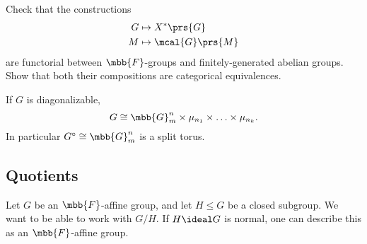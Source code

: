 \documentclass[10pt,a4paper,twoside,openany,hidelinks]{book}
\begin{document}
\begin{exercise}
Check that the constructions
\begin{align*}
G &\mapsto X^*\prs{G} \\
M &\mapsto \mcal{G}\prs{M}
\end{align*}
are functorial between $\mbb{F}$-groups and finitely-generated abelian groups.
Show that both their compositions are categorical equivalences.
\end{exercise}

\begin{corollary}
If $G$ is diagonalizable,
\[G \cong \mbb{G}_m^n \times \mu_{n_1} \times \ldots \times \mu_{n_k} \text{.}\]
In particular $G^{\circ} \cong \mbb{G}_m^n$ is a split torus.
\end{corollary}

\subsection{Quotients}

Let $G$ be an $\mbb{F}$-affine group, and let $H \leq G$ be a closed subgroup. We want to be able to work with $G/H$. If $H \ideal G$ is normal, one can describe this as an $\mbb{F}$-affine group.

\backmatter
\end{document}
